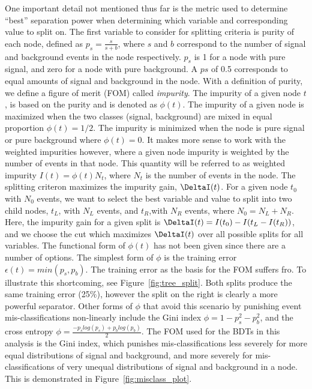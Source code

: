 One important detail not mentioned thus far is the metric used to determine ``best'' separation power when determining which variable and corresponding value to split on.
The first variable to consider for splitting criteria is purity of each node, defined as $p_{s}=\frac{s}{s+b}$, where $s$ and $b$ correspond to the number of signal and background
events in the node respectively. $p_{s}$ is 1 for a node with pure signal, and zero for a node with pure background. A $p{s}$ of 0.5 corresponds to equal amounts of signal and background
in the node. With a definition of purity, we define a figure of merit (FOM) called \textit{impurity}. The impurity of a given node $t$, is based on the purity and is denoted as
$\phi(t)$.
The impurity of a given node is maximized when the two classes (signal, background) are mixed in equal proportion $\phi(t) = 1/2$. The impurity is minimized when the node is pure
signal or pure background where $\phi(t) = 0$.
It makes more sense to work with the weighted impurities however, where a given node impurity is weighted by the number of events in that node. This quantity
will be referred to as weighted impurity $I(t) = \phi(t)N_{t}$, where $N_{t}$ is the number of events in the node. 
The splitting criteron maximizes the impurity gain, $\DeltaI(t)$. For a given node $t_{0}$ with $N_{0}$ events, we want to
select the best variable and value to split into two child nodes, $t_{L}$, with $N_{L}$ events, and $t_{R}$,with $N_{R}$ events, where $N_{0} = N_{L} + N_{R}$. Here, the
impurity gain for a given split is $\DeltaI(t) = I(t_{0}) - I(t_{L} - I(t_{R}))$, and we choose the cut which maximizes $\DeltaI(t)$ over all possible splits for all variables.
The functional form of $\phi(t)$ has not been given since there are a number of options. The simplest form of $\phi$ is the training error $\epsilon(t) = min(p_{s},p_{b})$.
The training error as the basis for the FOM suffers fro. To illustrate this shortcoming, see Figure~\ref{fig:tree_split}. Both splits produce
the same training error (25$\%$), however the split on the right is clearly a more powerful separator. Other forms of $\phi$ that avoid this scenario by punishing
event mis-classifications non-linearly include the Gini index $\phi = 1 - p_{s}^{2} - p_{b}^{2}$, and the cross entropy $\phi = \frac{-p_{s}log(p_{s})+p_{b}log(p_{b})}{2}$.
The FOM used for the BDTs in this analysis is the Gini index, which punishes mis-classifications less severely for more equal distributions of signal and background, and more
severely for mis-classifications of very unequal distributions of signal and background in a node. This is demonstrated in Figure~\ref{fig:misclass_plot}.


